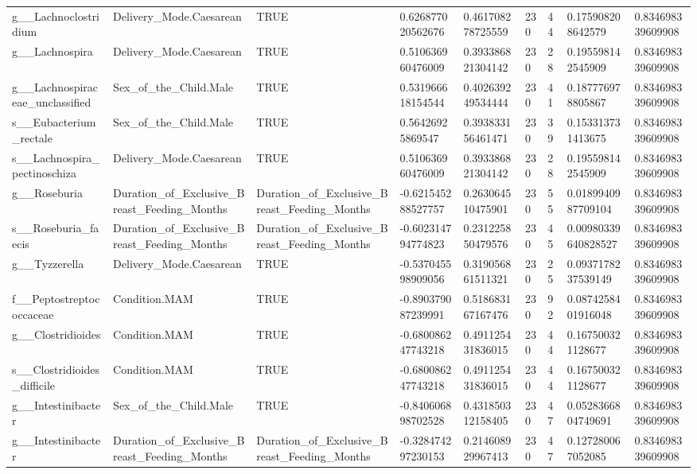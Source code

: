 \begin{longtable}{lllllllll}
g\_\_Lachnoclostridium & Delivery\_Mode.Caesarean & TRUE & 0.626877020562676 & 0.461708278725559 & 230 & 44 & 0.175908208642579 & 0.834698339609908 \\
g\_\_Lachnospira & Delivery\_Mode.Caesarean & TRUE & 0.510636960476009 & 0.393386821304142 & 230 & 28 & 0.195598142545909 & 0.834698339609908 \\
g\_\_Lachnospiraceae\_unclassified & Sex\_of\_the\_Child.Male & TRUE & 0.531966618154544 & 0.402639249534444 & 230 & 41 & 0.187776978805867 & 0.834698339609908 \\
s\_\_Eubacterium\_rectale & Sex\_of\_the\_Child.Male & TRUE & 0.56426925869547 & 0.393833156461471 & 230 & 39 & 0.153313731413675 & 0.834698339609908 \\
s\_\_Lachnospira\_pectinoschiza & Delivery\_Mode.Caesarean & TRUE & 0.510636960476009 & 0.393386821304142 & 230 & 28 & 0.195598142545909 & 0.834698339609908 \\
g\_\_Roseburia & Duration\_of\_Exclusive\_Breast\_Feeding\_Months & Duration\_of\_Exclusive\_Breast\_Feeding\_Months & -0.621545288527757 & 0.263064510475901 & 230 & 55 & 0.0189940987709104 & 0.834698339609908 \\
s\_\_Roseburia\_faecis & Duration\_of\_Exclusive\_Breast\_Feeding\_Months & Duration\_of\_Exclusive\_Breast\_Feeding\_Months & -0.602314794774823 & 0.231225850479576 & 230 & 45 & 0.00980339640828527 & 0.834698339609908 \\
g\_\_Tyzzerella & Delivery\_Mode.Caesarean & TRUE & -0.537045598909056 & 0.319056861511321 & 230 & 25 & 0.0937178237539149 & 0.834698339609908 \\
f\_\_Peptostreptococcaceae & Condition.MAM & TRUE & -0.890379087239991 & 0.518683167167476 & 230 & 92 & 0.0874258401916048 & 0.834698339609908 \\
g\_\_Clostridioides & Condition.MAM & TRUE & -0.680086247743218 & 0.491125431836015 & 230 & 44 & 0.167500321128677 & 0.834698339609908 \\
s\_\_Clostridioides\_difficile & Condition.MAM & TRUE & -0.680086247743218 & 0.491125431836015 & 230 & 44 & 0.167500321128677 & 0.834698339609908 \\
g\_\_Intestinibacter & Sex\_of\_the\_Child.Male & TRUE & -0.840606898702528 & 0.431850312158405 & 230 & 47 & 0.0528366804749691 & 0.834698339609908 \\
g\_\_Intestinibacter & Duration\_of\_Exclusive\_Breast\_Feeding\_Months & Duration\_of\_Exclusive\_Breast\_Feeding\_Months & -0.328474297230153 & 0.214608929967413 & 230 & 47 & 0.127280067052085 & 0.834698339609908 \\

\end{longtable}
